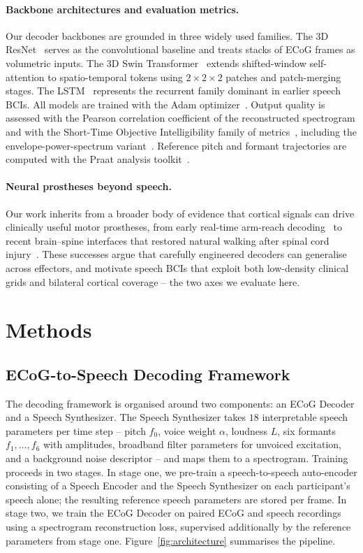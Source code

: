 \documentclass[11pt]{article}
\begin{document}
\paragraph{Backbone architectures and evaluation metrics.}
Our decoder backbones are grounded in three widely used families. The 3D
ResNet~\cite{he2016deep} serves as the convolutional baseline and treats
stacks of ECoG frames as volumetric inputs. The 3D Swin
Transformer~\cite{liu2021swin,liu2022video} extends shifted-window
self-attention to spatio-temporal tokens using $2\times2\times2$ patches
and patch-merging stages. The LSTM~\cite{hochreiter1997lstm} represents
the recurrent family dominant in earlier speech BCIs. All models are
trained with the Adam optimizer~\cite{kingma2015adam}. Output quality is
assessed with the Pearson correlation coefficient of the reconstructed
spectrogram and with the Short-Time Objective Intelligibility family of
metrics~\cite{taal2011algorithm}, including the envelope-power-spectrum
variant~\cite{relanoiborra2016sepsm}. Reference pitch and formant
trajectories are computed with the Praat analysis
toolkit~\cite{boersma2001praat}.

\paragraph{Neural prostheses beyond speech.}
Our work inherits from a broader body of evidence that cortical signals
can drive clinically useful motor prostheses, from early real-time
arm-reach decoding~\cite{wessberg2000realtime} to recent brain--spine
interfaces that restored natural walking after spinal cord
injury~\cite{lorach2023walking}. These successes argue that carefully
engineered decoders can generalise across effectors, and motivate speech
BCIs that exploit both low-density clinical grids and bilateral cortical
coverage -- the two axes we evaluate here.

\section{Methods}

\subsection{ECoG-to-Speech Decoding Framework}

The decoding framework is organised around two components: an ECoG
Decoder and a Speech Synthesizer. The Speech Synthesizer takes $18$
interpretable speech parameters per time step -- pitch $f_0$, voice weight
$\alpha$, loudness $L$, six formants $f_1,\dots,f_6$ with amplitudes,
broadband filter parameters for unvoiced excitation, and a background
noise descriptor -- and maps them to a spectrogram. Training proceeds in
two stages. In stage one, we pre-train a speech-to-speech auto-encoder
consisting of a Speech Encoder and the Speech Synthesizer on each
participant's speech alone; the resulting reference speech parameters
are stored per frame. In stage two, we train the ECoG Decoder on paired
ECoG and speech recordings using a spectrogram reconstruction loss,
supervised additionally by the reference parameters from stage one.
Figure~\ref{fig:architecture} summarises the pipeline.
\end{document}
